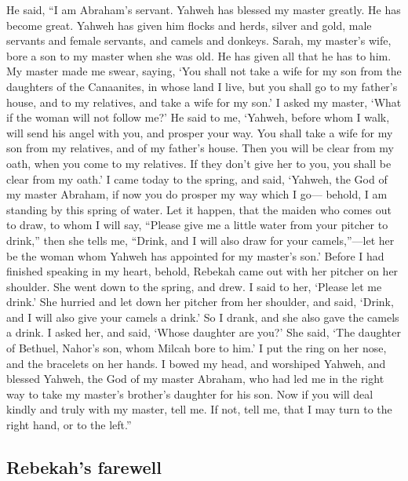  He said, ``I am Abraham's servant. 
Yahweh has blessed my master greatly. He has become great. Yahweh has
given him flocks and herds, silver and gold, male servants and female
servants, and camels and donkeys.  Sarah, my master's
wife, bore a son to my master when she was old. He has given all that he
has to him.  My master made me swear, saying, `You shall
not take a wife for my son from the daughters of the Canaanites, in
whose land I live,  but you shall go to my father's
house, and to my relatives, and take a wife for my son.' 
I asked my master, `What if the woman will not follow me?'
 He said to me, `Yahweh, before whom I walk, will send
his angel with you, and prosper your way. You shall take a wife for my
son from my relatives, and of my father's house.  Then
you will be clear from my oath, when you come to my relatives. If they
don't give her to you, you shall be clear from my oath.' 
I came today to the spring, and said, `Yahweh, the God of my master
Abraham, if now you do prosper my way which I go--- 
behold, I am standing by this spring of water. Let it happen, that the
maiden who comes out to draw, to whom I will say, ``Please give me a
little water from your pitcher to drink,''  then she
tells me, ``Drink, and I will also draw for your camels,''---let her be
the woman whom Yahweh has appointed for my master's son.'
 Before I had finished speaking in my heart, behold,
Rebekah came out with her pitcher on her shoulder. She went down to the
spring, and drew. I said to her, `Please let me drink.' 
She hurried and let down her pitcher from her shoulder, and said,
`Drink, and I will also give your camels a drink.' So I drank, and she
also gave the camels a drink.  I asked her, and said,
`Whose daughter are you?' She said, `The daughter of Bethuel, Nahor's
son, whom Milcah bore to him.' I put the ring on her nose, and the
bracelets on her hands.  I bowed my head, and worshiped
Yahweh, and blessed Yahweh, the God of my master Abraham, who had led me
in the right way to take my master's brother's daughter for his son.
 Now if you will deal kindly and truly with my master,
tell me. If not, tell me, that I may turn to the right hand, or to the
left.''

\hypertarget{rebekahs-farewell}{%
\subsection{Rebekah's farewell}\label{rebekahs-farewell}}

